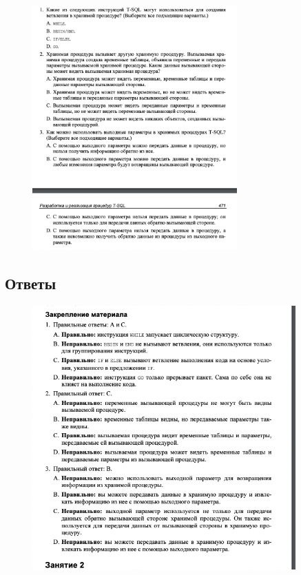 \begin{figure}[h!]
	\begin{center}
		\includegraphics[width=0.7\textwidth]{img/zakrep30.png}
	\end{center}
	\captionsetup{justification=centering}
\end{figure}
\newpage

\subsection*{Ответы}

\begin{figure}[h!]
	\begin{center}
		\includegraphics[width=0.9\textwidth]{img/ans30.png}
	\end{center}
	\captionsetup{justification=centering}
\end{figure}
\clearpage



